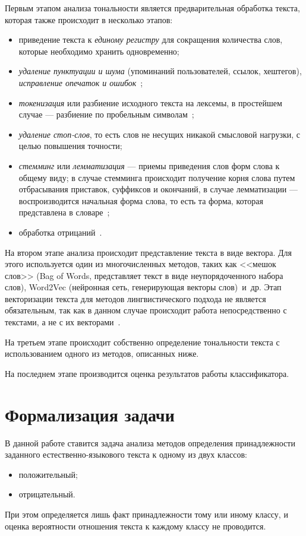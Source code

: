 Первым этапом анализа тональности является предварительная обработка текста,
которая также происходит в несколько этапов:
\begin{itemize}
    \item приведение текста к \textit{единому регистру} для сокращения
        количества слов, которые необходимо хранить одновременно;
    \item \textit{удаление пунктуации и шума} (упоминаний пользователей, ссылок,
        хештегов), \textit{исправление опечаток и ошибок}~\cite{article06};
    \item \textit{токенизация} или разбиение исходного текста на лексемы, в простейшем
        случае --- разбиение по пробельным символам~\cite{article07};
    \item \textit{удаление стоп-слов}, то есть слов не несущих никакой смысловой
        нагрузки, с целью повышения точности;
    \item \textit{стемминг} или \textit{лемматизация} --- приемы приведения слов
        форм слова к общему виду; в случае стемминга происходит получение корня
        слова путем отбрасывания приставок, суффиксов и окончаний, в случае
        лемматизации --- воспроизводится начальная форма слова, то есть та форма,
        которая представлена в словаре~\cite{article06};
    \item обработка отрицаний~\cite{article08}.
\end{itemize}

На втором этапе анализа происходит представление текста в виде вектора. Для
этого используется один из многочисленных методов, таких как <<мешок слов>> (Bag
of Words, представляет текст в виде неупорядоченного набора слов), Word2Vec
(нейронная сеть, генерирующая векторы слов)~и~др. Этап векторизации текста для
методов лингвистического подхода не является обязательным, так как в данном
случае происходит работа непосредственно с текстами, а не с их
векторами~\cite{article09}.

На третьем этапе происходит собственно определение тональности текста с
использованием одного из методов, описанных ниже.

На последнем этапе производится оценка результатов работы классификатора.

\section{Формализация задачи}

В данной работе ставится задача анализа методов определения принадлежности
заданного естественно-языкового текста к одному из двух классов:
\begin{itemize}
    \item положительный;
    \item отрицательный.
\end{itemize}

При этом определяется лишь факт принадлежности тому или иному классу, и оценка
вероятности отношения текста к каждому классу не проводится.

